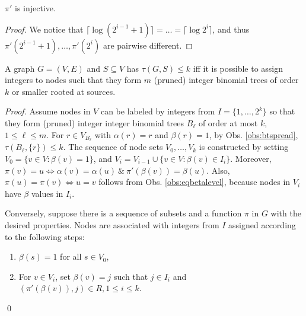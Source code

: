 \begin{observation}\label{obs:eqbetalevel}
$\pi'$ is injective.
\end{observation}
\begin{proof}
We notice that $\lceil\log (2^{i-1}+1)\rceil=\dots =\lceil\log 2^i\rceil$, and thus $\pi'(2^{i-1}+1),\dots,\pi'(2^i)$ are pairwise different.
\end{proof}

\begin{proposition}\label{lem:probeq}
A graph $G=(V,E)$ and $S\subseteq V$ has $\tau(G,S)\leq k$ iff it is possible to assign integers to nodes
such that they form $m$ (pruned) integer binomial trees of order $k$ or smaller rooted at sources.
\end{proposition}
\begin{proof}
Assume nodes in $V$ can be labeled by integers from $I=\{1,\dots,2^k\}$ so that they form (pruned) integer integer binomial trees $B_\ell$ of order at most $k$, $1\leq\ell\leq m$.
For $r\in V_{B_\ell}$ with $\alpha(r)=r$ and $\beta(r)=1$, by Obs. \ref{obs:btspread}, $\tau(B_\ell,\{r\})\leq k$.
The sequence of node sets $V_0,\dots,V_k$ is constructed by setting $V_0=\{v\in V:\beta(v)=1\}$, and $V_{i}=V_{i-1}\cup\{v\in V: \beta(v)\in I_i\}$.
Moreover, $\pi(v)=u\Leftrightarrow \alpha(v)=\alpha(u)~\&~\pi'(\beta(v))=\beta(u)$.
Also, $\pi(u)=\pi(v)\Leftrightarrow u=v$ follows from Obs. \ref{obs:eqbetalevel}, because nodes in $V_i$ have $\beta$ values in $I_i$.

Conversely, suppose there is a sequence of subsets and a function $\pi$ in $G$ with the desired properties.
Nodes are associated with integers from $I$ assigned according to the following steps:
\begin{enumerate}
\item $\beta(s)=1$ for all $s\in V_0$,
\item For $v\in V_i$, set $\beta(v)=j$ such that $j\in I_i$ and $(\pi'(\beta(v)),j)\in R, 1\leq i\leq k$.
\end{enumerate}
\qed
\end{proof}
